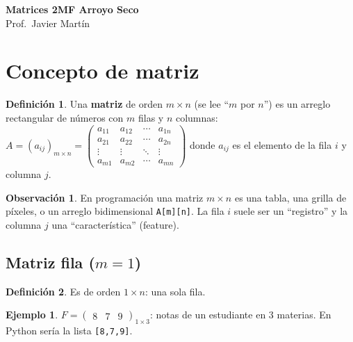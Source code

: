 \documentclass[a4paper,12pt]{article}
\theoremstyle{definition}
\newtheorem{definicion}{Definición}[section]
\newtheorem{ejemplo}{Ejemplo}[section]
\newtheorem{observacion}{Observación}[section]
\begin{document}
\begin{tcolorbox}[enhanced, colback=NavyBlue, colframe=NavyBlue!80!black,
  arc=4mm, boxrule=1pt, left=4mm, right=4mm, top=3mm, bottom=3mm,
  halign=center]
{\Large\bfseries\color{white} Matrices 2MF Arroyo Seco}\\[1mm]
{\color{white!90!} Prof.\ Javier Mart\'in}
\end{tcolorbox}

\section{Concepto de matriz}
\begin{definicion}
Una \textbf{matriz} de orden $m \times n$ (se lee ``$m$ por $n$'') es un arreglo rectangular de números con $m$ filas y $n$ columnas:
\(
A = (a_{ij})_{m \times n} =
\begin{pmatrix}
a_{11} & a_{12} & \cdots & a_{1n} \\
a_{21} & a_{22} & \cdots & a_{2n} \\
\vdots & \vdots & \ddots & \vdots \\
a_{m1} & a_{m2} & \cdots & a_{mn}
\end{pmatrix}
\)
donde $a_{ij}$ es el elemento de la fila $i$ y columna $j$.
\end{definicion}

\begin{observacion}
En programación una matriz $m \times n$ es una tabla, una grilla de píxeles, o un arreglo bidimensional \texttt{A[m][n]}. La fila $i$ suele ser un ``registro'' y la columna $j$ una ``característica'' (feature).
\end{observacion}

\subsection{Matriz fila ($m=1$)}
\begin{definicion}
Es de orden $1 \times n$: una sola fila.
\end{definicion}

\begin{ejemplo}
$F = \begin{pmatrix} 8 & 7 & 9 \end{pmatrix}_{1 \times 3}$: notas de un estudiante en 3 materias. En Python sería la lista \texttt{[8,7,9]}.
\end{ejemplo}
\end{document}
